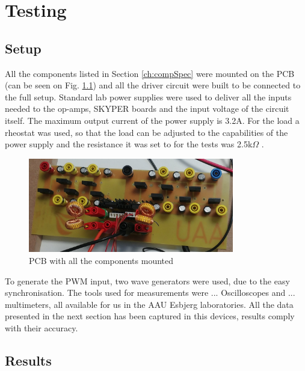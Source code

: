 \chapter{Testing}\label{ch:testing}

\section{Setup}
All the components listed in Section \ref{ch:compSpec} were mounted on the PCB (can be seen on Fig. \ref{fig:SETUP}) and all the driver circuit were built to be connected to the full setup.
Standard lab power supplies were used to deliver all the inputs needed to the op-amps, SKYPER boards and the input voltage of the circuit itself. 
The maximum output current of the power supply is 3.2A.
For the load a rheostat was used, so that the load can be adjusted to the capabilities of the power supply and the resistance it was set to for the tests was 2.5k$\Omega$ . 

\begin{figure}[H]
	\begin{center}
   \includegraphics[width=0.8\textwidth]{figures/06Testing/setup.jpg}
	\end{center}
	\vspace{-4mm}
	\caption{PCB with all the components mounted}
	\label{fig:SETUP}
\end{figure}

To generate the PWM input, two wave generators were used, due to the easy synchronisation. The tools used for measurements were ... Oscilloscopes and ... multimeters, all available for us in the AAU Esbjerg laboratories. All the data presented in the next section has been captured in this devices, results comply with their accuracy.
\clearpage
\vspace{-6mm}
\section{Results}

